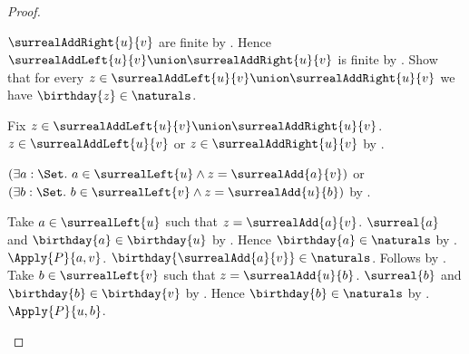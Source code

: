 \begin{proof}
\begin{subproof}
\begin{subproof}
            $\surrealAddRight{u}{v}$ are finite
            by
            .
        Hence $\surrealAddLeft{u}{v}\union
            \surrealAddRight{u}{v}$ is finite
            by .
        Show that for every $z\in
            \surrealAddLeft{u}{v}\union\surrealAddRight{u}{v}$
            we have $\birthday{z}\in\naturals$.
        \begin{subproof}
            Fix $z\in\surrealAddLeft{u}{v}\union
                \surrealAddRight{u}{v}$.
            $z\in\surrealAddLeft{u}{v}$ or
                $z\in\surrealAddRight{u}{v}$ by .
            \begin{byCase}
                    $(\exists a:\Set.\ a\in\surrealLeft{u}\land
                        z=\surrealAdd{a}{v})$ or
                        $(\exists b:\Set.\ b\in\surrealLeft{v}\land
                        z=\surrealAdd{u}{b})$
                        by .
                    \begin{byCase}
                            Take $a\in\surrealLeft{u}$ such that
                                $z=\surrealAdd{a}{v}$.
                            $\surreal{a}$ and
                                $\birthday{a}\in\birthday{u}$
                                by .
                            Hence $\birthday{a}\in\naturals$
                                by
                                .
                            $\Apply{P}{a,v}$.
                            $\birthday{\surrealAdd{a}{v}}\in\naturals$.
                            Follows by .
                            Take $b\in\surrealLeft{v}$ such that
                                $z=\surrealAdd{u}{b}$.
                            $\surreal{b}$ and
                                $\birthday{b}\in\birthday{v}$
                                by .
                            Hence $\birthday{b}\in\naturals$
                                by
                                .
                            $\Apply{P}{u,b}$.

\end{byCase}
\end{byCase}
\end{subproof}
\end{subproof}
\end{subproof}
\end{proof}
